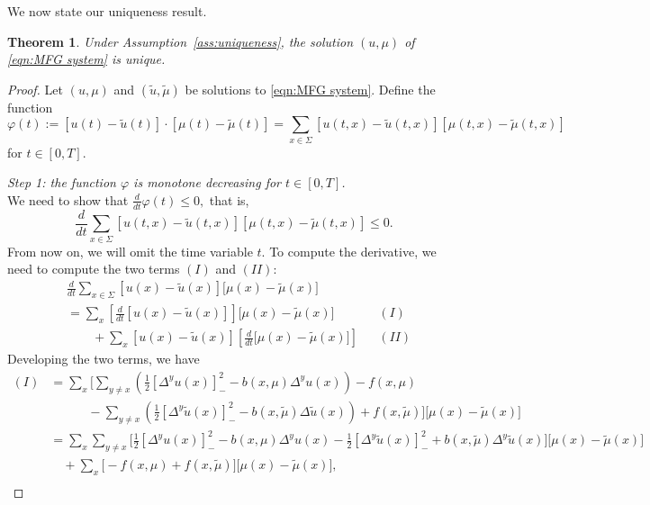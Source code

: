 \documentclass[11pt,a4paper]{amsart}
\newtheorem{theorem}{Theorem}
\theoremstyle{definition}
\begin{document}
We now state our uniqueness result.
\begin{theorem}
    Under Assumption~\ref{ass:uniqueness}, the solution $(u,\mu)$ of \eqref{eqn:MFG system} is unique.
\end{theorem}
\begin{proof}
Let $(u,\mu)$ and $(\tilde{u},\tilde{\mu})$ be solutions to \eqref{eqn:MFG system}.
Define the function 
$$\varphi(t) := [u(t)-\tilde{u}(t)] \cdot [\mu(t)-\tilde{\mu}(t)]
= \sum_{x \in \Sigma} [u(t,x)-\tilde{u}(t,x)][\mu(t,x)-\tilde{\mu}(t,x)]$$ 
for $t \in [0,T]$.

\emph{Step 1: the function $\varphi$ is monotone decreasing for $t \in [0,T]$.}\\
We need to show that
$
\frac{d}{dt} \varphi(t) \le 0,
$
that is,
\begin{equation*}
    \frac{d}{dt} \sum_{x \in \Sigma} [u(t,x)-\tilde{u}(t,x)][\mu(t,x)-\tilde{\mu}(t,x)] \le 0.
\end{equation*}
From now on, we will omit the time variable $t$.
To compute the derivative, we need to compute the two terms $(I)$ and $(II)$:
\begin{align*}
    &\frac{d}{dt} \sum_{x\in\Sigma} [u(x)-\tilde{u}(x)]\big[\mu(x)-\tilde{\mu}(x)\big] \\
    &= \sum_{x} \left[\frac{d}{dt}[u(x)-\tilde{u}(x)]\right]\big[\mu(x)-\tilde{\mu}(x)\big] &&(I)\\
    &\qquad + \sum_{x} [u(x)-\tilde{u}(x)]\left[\frac{d}{dt}\big[\mu(x)-\tilde{\mu}(x)\big]\right] &&(II)
\end{align*}
%
Developing the two terms, we have
\allowdisplaybreaks
\begin{align*}
    (I)
    &= \sum_{x} 
    \Bigg[
    \sum_{y\neq x}
    \left( \frac{1}{2}[\Delta^{y}u(x)]_{-}^2 - b(x,\mu)\Delta^{y}u(x) \right)
    - f(x,\mu) \\
    &\qquad\quad - \sum_{y\neq x} 
    \left( \frac{1}{2}[\Delta^{y}\tilde{u}(x)]_{-}^2 - b(x,\tilde{\mu})\Delta\tilde{u}(x) \right) 
    + f(x,\tilde{\mu}) 
    \Bigg]
    \big[\mu(x)-\tilde{\mu}(x)\big] \\
    &= \sum_{x}\sum_{y \neq x}
    \Bigg[
    \frac{1}{2}[\Delta^{y}u(x)]_{-}^2 - b(x,\mu)\Delta^{y}u(x)
    - \frac{1}{2}[\Delta^{y}\tilde{u}(x)]_{-}^2 + b(x,\tilde{\mu})\Delta^{y}\tilde{u}(x)
    \Bigg] 
    \big[\mu(x)-\tilde{\mu}(x)\big] \\
    &\quad + \sum_{x} \big[-f(x,\mu)+f(x,\tilde{\mu})\big] \big[\mu(x)-\tilde{\mu}(x)\big], \\

\end{align*}
\end{proof}
\end{document}
